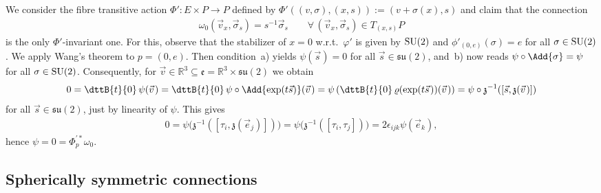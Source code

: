 \documentclass[pdftex]{sigma}
\numberwithin{equation}{section}
\begin{document}
We consider the f\/ibre transitive action $\Phi'\colon E\times P\rightarrow P$ def\/ined by
$\Phi'((v,\sigma),(x,s)):=(v+ \sigma(x),s)$ and claim that the connection
\begin{gather*}
\omega_0(\vec{v}_x,\vec{\sigma}_s)=s^{-1}\vec{\sigma}_s
\qquad\forall\, (\vec{v}_x,\vec{\sigma}_s) \in T_{(x,s)}P
\end{gather*}
is the only $\Phi'$-invariant one.
For this, observe that the stabilizer of $x=0$ w.r.t.~$\varphi'$ is given by ${\rm SU}(2)$ and $\phi'_{(0,e)}(\sigma)=e$ for
all $\sigma\in {\rm SU}(2)$.
We apply Wang's theorem to $p=(0,e)$.
Then condition~a) yields $\psi(\vec{s})=0$ for all $\vec{s}\in \mathfrak{su}(2)$, and~b)
now reads $\psi\circ \Add{\sigma}=\psi$ for all $\sigma\in {\rm SU}(2)$.
Consequently, for $\vec{v}\in \mathbb{R}^3\subseteq \mathfrak{e}=\mathbb{R}^3 \times \mathfrak{su}(2)$ we obtain
\begin{gather*}
0=\dttB{t}{0}\,\psi(\vec{v}\hspace{1pt})=\dttB{t}{0}\, \psi\circ \Add{\exp(t\vec{s})}(\vec{v}\hspace{1pt})
=\psi\left(\dttB{t}{0}\,\varrho(\exp(t\vec{s}\hspace{1pt}))(\vec{v}\hspace{1pt})\right)=\psi \circ {\mathfrak{z}}^{-1}([\vec{s},{\mathfrak{z}}(\vec{v}\hspace{1pt})])
\end{gather*}
for all $\vec{s}\in \mathfrak{su}(2)$, just by linearity of $\psi$.
This gives
\begin{gather*}
0=\psi\big({\mathfrak{z}}^{-1}([\tau_i,{\mathfrak{z}}(\vec{e}_j)])\big)=\psi\big({\mathfrak{z}}^{-1}([\tau_i,\tau_j])\big)=2
\epsilon_{ijk}\psi(\vec{e}_k),
\end{gather*}
hence $\psi=0=\Phi^{\prime*}_{p}\omega_0$.

\subsection{Spherically symmetric connections}\label{subsec:IsotrConn}
\end{document}
